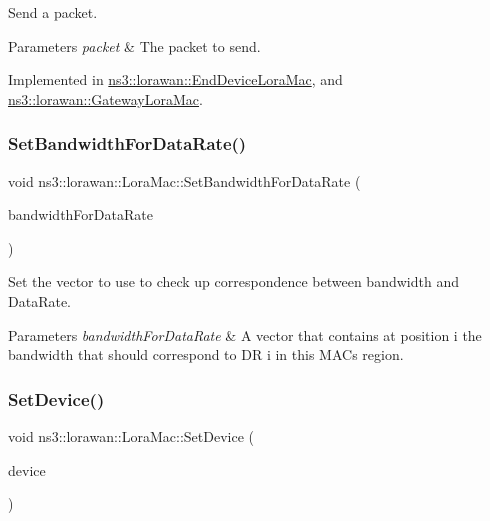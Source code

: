 Send a packet.


\begin{DoxyParams}{Parameters}
{\em packet} & The packet to send. \\
\hline
\end{DoxyParams}


Implemented in \hyperlink{classns3_1_1lorawan_1_1EndDeviceLoraMac_a6566cdcccf21b69267215758f36e7ee9}{ns3\+::lorawan\+::\+End\+Device\+Lora\+Mac}, and \hyperlink{classns3_1_1lorawan_1_1GatewayLoraMac_adc8823176576f9d19d4ae663d88d869e}{ns3\+::lorawan\+::\+Gateway\+Lora\+Mac}.

\mbox{\label{classns3_1_1lorawan_1_1LoraMac_a7b915e6aa7ec36d1ac2581526afd652c}} 
\subsubsection{\texorpdfstring{Set\+Bandwidth\+For\+Data\+Rate()}{SetBandwidthForDataRate()}}
{\footnotesize\ttfamily void ns3\+::lorawan\+::\+Lora\+Mac\+::\+Set\+Bandwidth\+For\+Data\+Rate (\begin{DoxyParamCaption}\item[{std\+::vector$<$ double $>$}]{bandwidth\+For\+Data\+Rate }\end{DoxyParamCaption})}

Set the vector to use to check up correspondence between bandwidth and Data\+Rate.


\begin{DoxyParams}{Parameters}
{\em bandwidth\+For\+Data\+Rate} & A vector that contains at position i the bandwidth that should correspond to DR i in this M\+AC\textquotesingle{}s region. \\
\hline
\end{DoxyParams}
\mbox{\label{classns3_1_1lorawan_1_1LoraMac_a3b5d08b43f747474078bb78c45af01aa}} 
\subsubsection{\texorpdfstring{Set\+Device()}{SetDevice()}}
{\footnotesize\ttfamily void ns3\+::lorawan\+::\+Lora\+Mac\+::\+Set\+Device (\begin{DoxyParamCaption}\item[{Ptr$<$ \hyperlink{classNetDevice}{Net\+Device} $>$}]{device }\end{DoxyParamCaption})}

